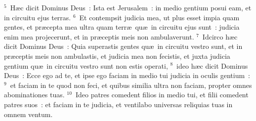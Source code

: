 ${}^{5}$~H\ae c dicit Dominus Deus~: Ista est Jerusalem~: in medio gentium posui eam, et in circuitu ejus terras.
${}^{6}$~Et contempsit judicia mea, ut plus esset impia quam gentes, et pr\ae cepta mea ultra quam terr\ae\ qu\ae\ in circuitu ejus sunt~: judicia enim mea projecerunt, et in pr\ae ceptis meis non ambulaverunt.
${}^{7}$~Idcirco h\ae c dicit Dominus Deus~: Quia superastis gentes qu\ae\ in circuitu vestro sunt, et in pr\ae ceptis meis non ambulastis, et judicia mea non fecistis, et juxta judicia gentium qu\ae\ in circuitu vestro sunt non estis operati,
${}^{8}$~ideo h\ae c dicit Dominus Deus~: Ecce ego ad te, et ipse ego faciam in medio tui judicia in oculis gentium~:
${}^{9}$~et faciam in te quod non feci, et quibus similia ultra non faciam, propter omnes abominationes tuas.
${}^{10}$~Ideo patres comedent filios in medio tui, et filii comedent patres suos~: et faciam in te judicia, et ventilabo universas reliquias tuas in omnem ventum.


